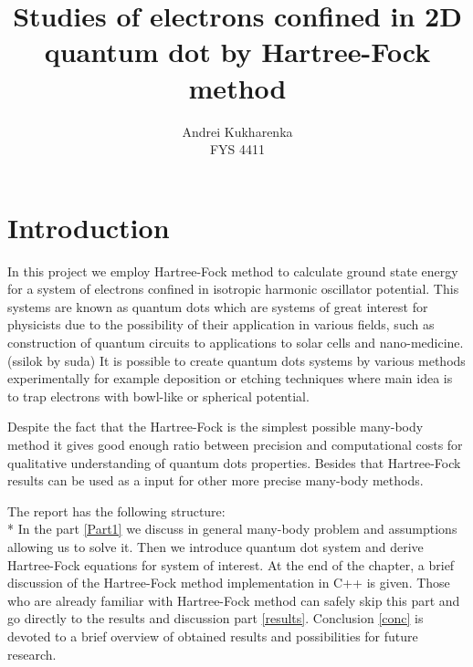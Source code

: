 \documentclass[10pt]{article}
\begin{document}
\setlength\parindent{1pt}
\title{Studies of electrons confined in 2D quantum dot by Hartree-Fock method}
\author{Andrei Kukharenka \\  
FYS 4411 
}

\maketitle
\begin{abstract}



\end{abstract}
\clearpage 






\section{Introduction}


In this project we employ Hartree-Fock method to calculate ground state energy for a system of electrons confined in isotropic harmonic oscillator potential. This systems are known as quantum dots which are systems of great interest for physicists due to the possibility of their application in various fields, such as construction of quantum circuits to applications to solar cells and nano-medicine.(ssilok by suda) It is possible to create quantum dots systems by various methods experimentally for example deposition or etching\cite{manufacturing} techniques where main idea is to trap electrons  with bowl-like or spherical potential. 

Despite the fact that the Hartree-Fock is the simplest possible many-body method it gives good enough ratio between precision and computational costs for qualitative understanding of quantum dots properties. Besides that Hartree-Fock results can be used as a input for other more precise many-body methods.


The report has the following structure:\\*
In the part \ref{Part1}  we discuss in general many-body problem and assumptions allowing us to solve it. Then we introduce quantum dot system and derive Hartree-Fock equations for system of interest. At the end of the chapter, a brief discussion of the Hartree-Fock method implementation in C++ is given.
Those who are already familiar with Hartree-Fock method can safely skip this part and go directly to the results and discussion part \ref{results}. Conclusion \ref{conc} is devoted to a brief overview of obtained results and possibilities for future research. 
\end{document}
